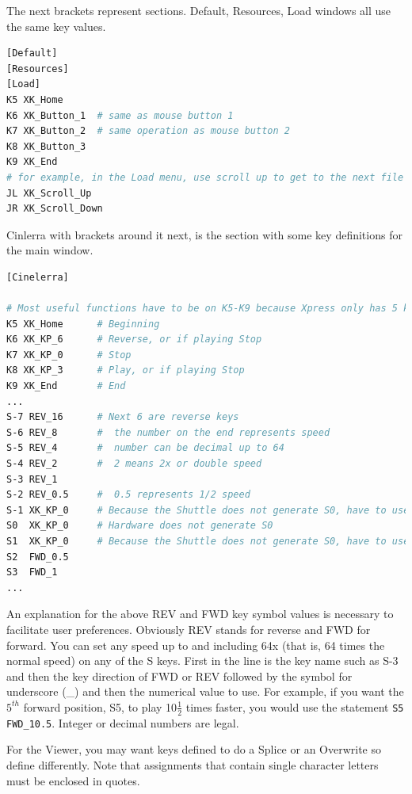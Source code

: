 \noindent The next brackets represent sections. Default, Resources, Load windows all use the same key values.

\begin{lstlisting}[language=Bash,numbers=none]
[Default] 
[Resources] 
[Load] 
K5 XK_Home 
K6 XK_Button_1	# same as mouse button 1 
K7 XK_Button_2	# same operation as mouse button 2
K8 XK_Button_3 
K9 XK_End 
# for example, in the Load menu, use scroll up to get to the next file name 
JL XK_Scroll_Up	
JR XK_Scroll_Down
\end{lstlisting}

\noindent Cinlerra with brackets around it next, is the section with some key definitions for the main window.

\begin{lstlisting}[language=Bash,numbers=none]
[Cinelerra] 

# Most useful functions have to be on K5-K9 because Xpress only has 5 keys 
K5 XK_Home      # Beginning 
K6 XK_KP_6      # Reverse, or if playing Stop 
K7 XK_KP_0      # Stop 
K8 XK_KP_3      # Play, or if playing Stop 
K9 XK_End       # End 
... 
S-7 REV_16     	# Next 6 are reverse keys 
S-6 REV_8      	#  the number on the end represents speed
S-5 REV_4      	#  number can be decimal up to 64 
S-4 REV_2      	#  2 means 2x or double speed 
S-3 REV_1 
S-2 REV_0.5    	#  0.5 represents 1/2 speed 
S-1 XK_KP_0    	# Because the Shuttle does not generate S0, have to use S-1 
S0  XK_KP_0   	# Hardware does not generate S0 
S1  XK_KP_0   	# Because the Shuttle does not generate S0, have to use S1 
S2  FWD_0.5 
S3  FWD_1 
... 
\end{lstlisting}

\noindent An explanation for the above REV and FWD key symbol values is necessary to facilitate user preferences.  Obviously REV stands for reverse and FWD for forward.  You can set any speed up to and including 64x (that is, 64 times the normal speed) on any of the S keys.  First in the line is the key name such as S-3 and then the key direction of FWD or REV followed by the symbol for underscore (\_) and then the numerical value to use.  For example, if you want the $5^{th}$ forward position, S5, to play 10$\frac{1}{2}$ times faster, you would use the statement \texttt{S5 FWD\_10.5}.  Integer or decimal numbers are legal.

For the Viewer, you may want keys defined to do a Splice or an Overwrite so define differently.  Note that assignments that contain single character letters must be enclosed in quotes.

